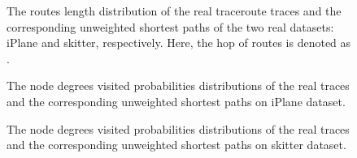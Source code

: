 \documentclass[a4paper]{llncs}
\begin{document}
\begin{figure}[!t]
\centering
{}
\hspace{2em}
\vspace{-1.7em}
\caption{The routes length distribution of the real traceroute traces and the corresponding unweighted shortest paths of the two real datasets: iPlane and skitter, respectively. Here, the hop of routes is denoted as .}
\label{figure2}
\vspace{-0.8em}
\end{figure}


\begin{figure}[!t]
\centering
{}
\hspace{2em}
\vspace{-1.7em}
\caption{The node degrees visited probabilities distributions of the real traces and the corresponding unweighted shortest paths on iPlane dataset.}
\label{figure3}
\vspace{-0.8em}
\end{figure}

\begin{figure}[!t]
\centering
{}
\hspace{2em}
\vspace{-1.7em}
\caption{The node degrees visited probabilities distributions of the real traces and the corresponding unweighted shortest paths on skitter dataset.}
\label{figure4}
\vspace{-0.5em}
\end{figure}
\end{document}
